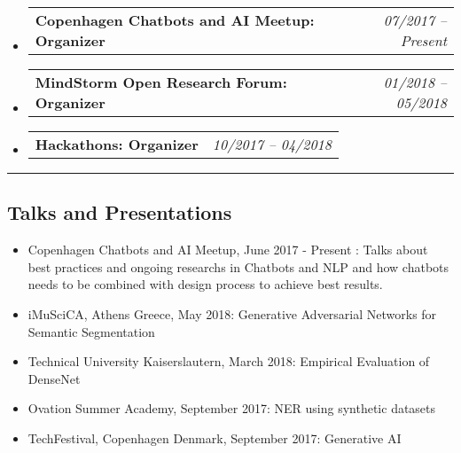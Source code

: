 \documentclass[10pt,letterpaper]{article}
\makeatletter
\newcommand{\headerrow}[2]
{\begin{tabular*}{\linewidth}{l@{\extracolsep{\fill}}r}
	#1 &
	#2 \\
\end{tabular*}}
\makeatother
\begin{document}
\begin{itemize}
	\parskip=0.1em
		\item 
	\headerrow
		{\textbf{Copenhagen Chatbots and AI Meetup: Organizer}}
		{\emph{07/2017 -- Present}}
	
	\item 
	\headerrow
		{\textbf{MindStorm Open Research Forum: Organizer}}
		{\emph{01/2018 -- 05/2018}}
	
		\item 
	\headerrow
		{\textbf{Hackathons: Organizer}}
		{\emph{10/2017 -- 04/2018}}
	

\end{itemize}

\hrule
\vspace{-0.4em}
\subsection*{Talks and Presentations}

\begin{itemize}
	\parskip=0.1em
	
	\item Copenhagen Chatbots and AI Meetup, June 2017 - Present : Talks about best practices and ongoing researchs in Chatbots and NLP and how chatbots needs to be combined with design process to achieve best results.
	
	\item iMuSciCA, Athens Greece, May 2018: Generative Adversarial Networks for Semantic Segmentation 
	
	\item Technical University Kaiserslautern, March 2018: Empirical Evaluation of DenseNet 
		
	\item Ovation Summer Academy, September 2017: NER using synthetic datasets 
	
	\item TechFestival, Copenhagen Denmark, September 2017: Generative AI 
	
	
\end{itemize}
\end{document}
